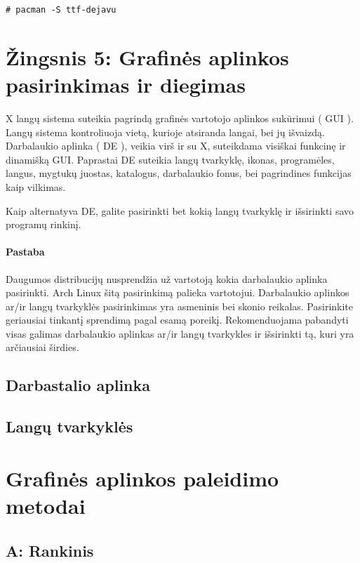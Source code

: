     \begin{verbatim}
# pacman -S ttf-dejavu
    \end{verbatim}

  \section{Žingsnis 5: Grafinės aplinkos pasirinkimas ir diegimas}

    X langų sistema suteikia pagrindą grafinės vartotojo aplinkos
    sukūrimui ( GUI ). Langų sistema kontroliuoja vietą, kurioje
    atsiranda langai, bei jų išvaizdą. Darbalaukio aplinka ( DE ),
    veikia virš ir su X, suteikdama visiškai funkcinę ir dinamišką
    GUI. Paprastai DE suteikia langų tvarkyklę, ikonas, programėles,
    langus, mygtukų juostas, katalogus, darbalaukio fonus, bei
    pagrindines funkcijas kaip vilkimas.

    Kaip alternatyva DE, galite pasirinkti bet kokią langų tvarkyklę
    ir išsirinkti savo programų rinkinį. 

    \paragraph{Pastaba} Daugumos distribucijų nusprendžia už vartotoją
    kokia darbalaukio aplinka pasirinkti. Arch Linux šitą pasirinkimą
    palieka vartotojui. Darbalaukio aplinkos ar/ir langų tvarkyklės
    pasirinkimas yra asmeninis bei skonio reikalas. Pasirinkite
    geriausiai tinkantį sprendimą pagal esamą poreikį. Rekomenduojama
    pabandyti visas galimas darbalaukio aplinkas ar/ir langų
    tvarkykles ir išsirinkti tą, kuri yra arčiausiai širdies.

    \subsection{Darbastalio aplinka}


    \subsection{Langų tvarkyklės}


  \section{Grafinės aplinkos paleidimo metodai}

    \subsection{A: Rankinis}

